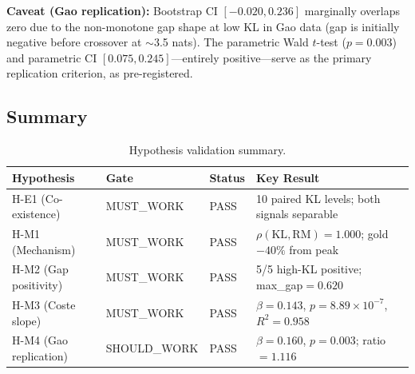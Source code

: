 \textbf{Caveat (Gao replication):} Bootstrap CI $[-0.020, 0.236]$ marginally overlaps zero due to the non-monotone gap shape at low KL in Gao data (gap is initially negative before crossover at $\sim$3.5 nats). The parametric Wald $t$-test ($p = 0.003$) and parametric CI $[0.075, 0.245]$---entirely positive---serve as the primary replication criterion, as pre-registered.

\subsection{Summary}

\begin{table}[h]
\centering
\caption{Hypothesis validation summary.}
\label{tab:summary}
\begin{tabular}{lllp{5.5cm}}
\toprule
Hypothesis & Gate & Status & Key Result \\
\midrule
H-E1 (Co-existence) & MUST\_WORK & PASS & 10 paired KL levels; both signals separable \\
H-M1 (Mechanism) & MUST\_WORK & PASS & $\rho(\text{KL},\text{RM})=1.000$; gold $-40\%$ from peak \\
H-M2 (Gap positivity) & MUST\_WORK & PASS & 5/5 high-KL positive; max\_gap$=0.620$ \\
H-M3 (Coste slope) & MUST\_WORK & PASS & $\beta=0.143$, $p=8.89\times10^{-7}$, $R^2=0.958$ \\
H-M4 (Gao replication) & SHOULD\_WORK & PASS & $\beta=0.160$, $p=0.003$; ratio$=1.116$ \\
\bottomrule
\end{tabular}
\end{table}
